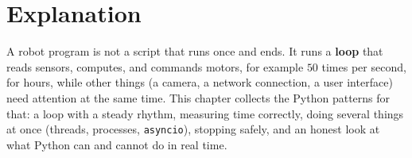 \label{ch:py12}

\section*{Explanation}
A robot program is not a script that runs once and ends. It runs a \textbf{loop} that reads sensors, computes, and commands motors, for example $50$ times per second, for hours, while other things (a camera, a network connection, a user interface) need attention at the same time. This chapter collects the Python patterns for that: a loop with a steady rhythm, measuring time correctly, doing several things at once (threads, processes, \texttt{asyncio}), stopping safely, and an honest look at what Python can and cannot do in real time.

